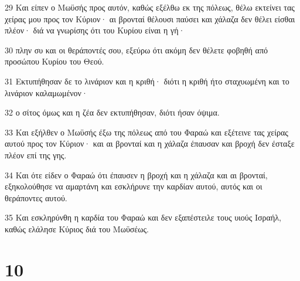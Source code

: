 \par 29 Και είπεν ο Μωϋσής προς αυτόν, καθώς εξέλθω εκ της πόλεως, θέλω εκτείνει τας χείρας μου προς τον Κύριον· αι βρονταί θέλουσι παύσει και χάλαζα δεν θέλει είσθαι πλέον· διά να γνωρίσης ότι του Κυρίου είναι η γή·
\par 30 πλην συ και οι θεράποντές σου, εξεύρω ότι ακόμη δεν θέλετε φοβηθή από προσώπου Κυρίου του Θεού.
\par 31 Εκτυπήθησαν δε το λινάριον και η κριθή· διότι η κριθή ήτο σταχυωμένη και το λινάριον καλαμωμένον·
\par 32 ο σίτος όμως και η ζέα δεν εκτυπήθησαν, διότι ήσαν όψιμα.
\par 33 Και εξήλθεν ο Μωϋσής έξω της πόλεως από του Φαραώ και εξέτεινε τας χείρας αυτού προς τον Κύριον· και αι βρονταί και η χάλαζα έπαυσαν και βροχή δεν έσταξε πλέον επί της γης.
\par 34 Και ότε είδεν ο Φαραώ ότι έπαυσεν η βροχή και η χάλαζα και αι βρονταί, εξηκολούθησε να αμαρτάνη και εσκλήρυνε την καρδίαν αυτού, αυτός και οι θεράποντες αυτού.
\par 35 Και εσκληρύνθη η καρδία του Φαραώ και δεν εξαπέστειλε τους υιούς Ισραήλ, καθώς ελάλησε Κύριος διά του Μωϋσέως.

\chapter{10}

